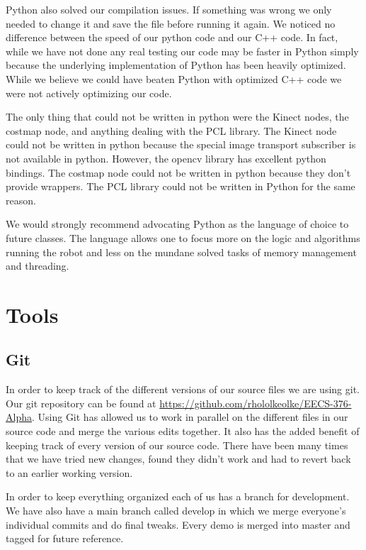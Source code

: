 Python also solved our compilation issues.  If something was wrong we only needed to change it and save the file before running it again. We noticed no difference between the speed of our python code and our C++ code. In fact, while we have not done any real testing our code may be faster in Python simply because the underlying implementation of Python has been heavily optimized. While we believe we could have beaten Python with optimized C++ code we were not actively optimizing our code.

The only thing that could not be written in python were the Kinect nodes, the costmap node, and anything dealing with the PCL library. The Kinect node could not be written in python because the special image transport subscriber is not available in python. However, the opencv library has excellent python bindings. The costmap node could not be written in python because they don't provide wrappers. The PCL library could not be written in Python for the same reason.

We would strongly recommend advocating Python as the language of choice to future classes. The language allows one to focus more on the logic and algorithms running the robot and less on the mundane solved tasks of memory management and threading.

\section{Tools}

\subsection{Git}
In order to keep track of the different versions of our source files
we are using git.  Our git repository can be found at
\url{https://github.com/rhololkeolke/EECS-376-Alpha}.  Using Git has
allowed us to work in parallel on the different files in our source
code and merge the various edits together.  It also has the added
benefit of keeping track of every version of our source code. There
have been many times that we have tried new changes, found they didn't
work and had to revert back to an earlier working version.

In order to keep everything organized each of us has a branch for
development.  We have also have a main branch called develop in which
we merge everyone's individual commits and do final tweaks. Every
demo is merged into master and tagged for future reference.


